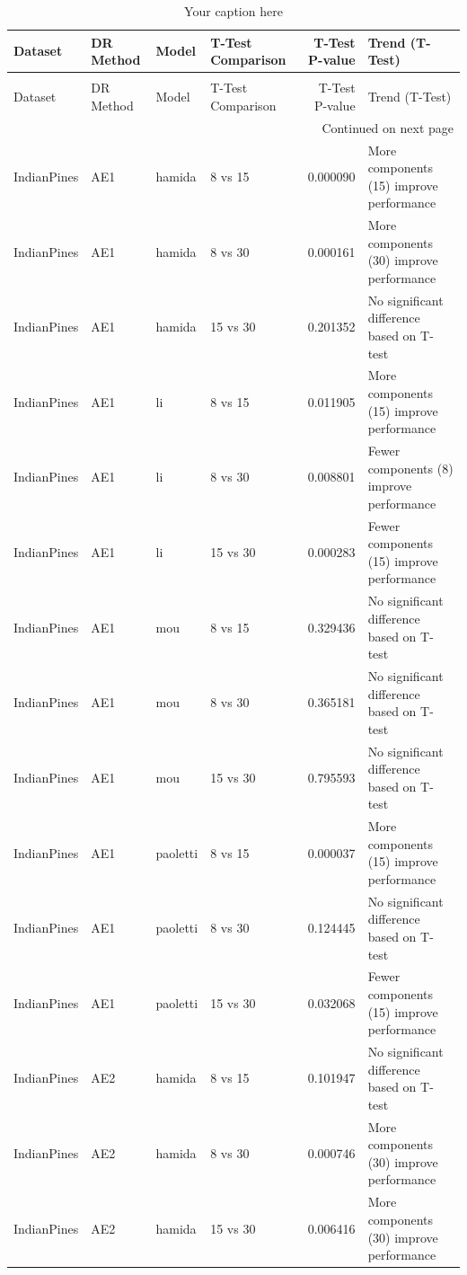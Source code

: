 \begin{longtable}{llllrl}
\caption{Your caption here} \label{tab:your_label} \\
\toprule
Dataset & DR Method & Model & T-Test Comparison & T-Test P-value & Trend (T-Test) \\
\midrule
\endfirsthead
\caption[]{Your caption here} \\
\toprule
Dataset & DR Method & Model & T-Test Comparison & T-Test P-value & Trend (T-Test) \\
\midrule
\endhead
\midrule
\multicolumn{6}{r}{Continued on next page} \\
\midrule
\endfoot
\bottomrule
\endlastfoot
IndianPines & AE1 & hamida & 8 vs 15 & 0.000090 & More components (15) improve performance \\
IndianPines & AE1 & hamida & 8 vs 30 & 0.000161 & More components (30) improve performance \\
IndianPines & AE1 & hamida & 15 vs 30 & 0.201352 & No significant difference based on T-test \\
IndianPines & AE1 & li & 8 vs 15 & 0.011905 & More components (15) improve performance \\
IndianPines & AE1 & li & 8 vs 30 & 0.008801 & Fewer components (8) improve performance \\
IndianPines & AE1 & li & 15 vs 30 & 0.000283 & Fewer components (15) improve performance \\
IndianPines & AE1 & mou & 8 vs 15 & 0.329436 & No significant difference based on T-test \\
IndianPines & AE1 & mou & 8 vs 30 & 0.365181 & No significant difference based on T-test \\
IndianPines & AE1 & mou & 15 vs 30 & 0.795593 & No significant difference based on T-test \\
IndianPines & AE1 & paoletti & 8 vs 15 & 0.000037 & More components (15) improve performance \\
IndianPines & AE1 & paoletti & 8 vs 30 & 0.124445 & No significant difference based on T-test \\
IndianPines & AE1 & paoletti & 15 vs 30 & 0.032068 & Fewer components (15) improve performance \\
IndianPines & AE2 & hamida & 8 vs 15 & 0.101947 & No significant difference based on T-test \\
IndianPines & AE2 & hamida & 8 vs 30 & 0.000746 & More components (30) improve performance \\
IndianPines & AE2 & hamida & 15 vs 30 & 0.006416 & More components (30) improve performance \\

\end{longtable}
